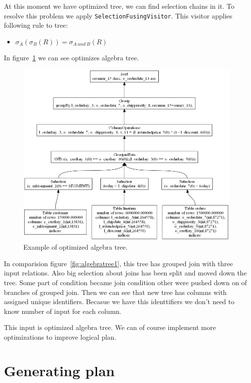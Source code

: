 At this moment we have optimized tree, we can find selection chains in it. To resolve this problem we apply \texttt{SelectionFusingVisitor}. This visitor applies following rule to tree:
\begin{itemize}
\item $\sigma_{A}(\sigma_{B}(R))=\sigma_{A~and~B}(R)$
\end{itemize}

In figure~\ref{fig:algebratree2} we can see optimizes algebra tree.

\begin{figure}[h!]
  \centering
    \includegraphics[width=1.0\textwidth]{algebratree2}

      \caption{Example of optimized algebra tree.}
          \label{fig:algebratree2}
\end{figure}

In comparision figure~\ref{fig:algebratree1}, this tree has grouped join with three input relations. Also big selection about joins has been split and moved down the tree. Some part of condition became join condition other were pushed down on of branches of grouped join. Then we can see that new tree has columns with assigned unique identifiers. Becasue we have this identtifiers we don't need to know number of input for each column.

This input is optimized algebra tree. We can of course implement more optimizations to improve logical plan.

\section{Generating plan}

